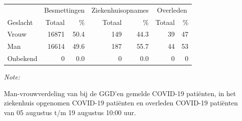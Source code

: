 \documentclass[
  english,
  man,floatsintext]{apa6}
\begin{document}
\begin{table}
\centering\begingroup\fontsize{11}{13}\selectfont

\begin{threeparttable}
\begin{tabular}{lrrrrrr}
\toprule
\multicolumn{1}{c}{ } & \multicolumn{2}{c}{Besmettingen} & \multicolumn{2}{c}{Ziekenhuisopnames} & \multicolumn{2}{c}{Overleden} \\
\cmidrule(l{3pt}r{3pt}){2-3} \cmidrule(l{3pt}r{3pt}){4-5} \cmidrule(l{3pt}r{3pt}){6-7}
Geslacht & Totaal & \% & Totaal & \% & Totaal & \%\\
\midrule
Vrouw & 16871 & 50.4 & 149 & 44.3 & 39 & 47\\
Man & 16614 & 49.6 & 187 & 55.7 & 44 & 53\\
Onbekend & 0 & 0.0 & 0 & 0.0 & 0 & 0\\
\bottomrule
\end{tabular}
\begin{tablenotes}
\item \textit{Note: } 
\item Man-vrouwverdeling van bij de GGD’en gemelde COVID-19 patiënten, in het ziekenhuis opgenomen COVID-19 patiënten en overleden COVID-19 patiënten van 05 augustus t/m 19 augustus 10:00 uur.
\end{tablenotes}
\end{threeparttable}
\endgroup{}
\end{table}
\newpage
\end{document}
